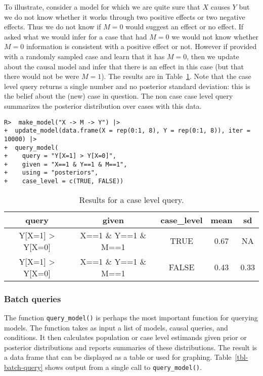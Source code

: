 \documentclass[
  11pt,
  article]{jss}
\begin{document}
To illustrate, consider a model for which we are quite sure that \(X\)
causes \(Y\) but we do not know whether it works through two positive
effects or two negative effects. Thus we do not know if \(M=0\) would
suggest an effect or no effect. If asked what we would infer for a case
that had \(M=0\) we would not know whether \(M=0\) information is
consistent with a positive effect or not. However if provided with a
randomly sampled case and learn that it has \(M=0\), then we update
about the causal model and infer that there is an effect in this case
(but that there would not be were \(M=1\)). The results are in
Table~\ref{tbl-case-level}. Note that the case level query returns a
single number and no posterior standard deviation: this is the belief
about the (new) case in question. The non case case level query
summarizes the posterior distribution over cases with this data.

\begin{verbatim}
R>  make_model("X -> M -> Y") |>
+  update_model(data.frame(X = rep(0:1, 8), Y = rep(0:1, 8)), iter = 10000) |> 
+  query_model(
+    query = "Y[X=1] > Y[X=0]",
+    given = "X==1 & Y==1 & M==1",
+    using = "posteriors",
+    case_level = c(TRUE, FALSE))
\end{verbatim}

\hypertarget{tbl-case-level}{}
\begin{longtable}{ccccc}
\caption{\label{tbl-case-level}Results for a case level query. }\tabularnewline

\toprule
query & given & case\_level & mean & sd\\
\midrule
Y[X=1] > Y[X=0] & X==1 \& Y==1 \& M==1 & TRUE & 0.67 & NA\\
Y[X=1] > Y[X=0] & X==1 \& Y==1 \& M==1 & FALSE & 0.43 & 0.33\\
\bottomrule
\end{longtable}

\hypertarget{batch-queries}{%
\subsubsection{Batch queries}\label{batch-queries}}

The function \texttt{query\_model()} is perhaps the most important
function for querying models. The function takes as input a list of
models, causal queries, and conditions. It then calculates population or
case level estimands given prior or posterior distributions and reports
summaries of these distributions. The result is a data frame that can be
displayed as a table or used for graphing. Table~\ref{tbl-batch-query}
shows output from a single call to \texttt{query\_model()}.
\end{document}
